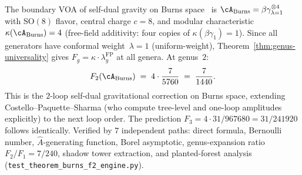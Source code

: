 \begin{remark}%
\label{rem:burns-f2-verification}%
%
%
%
The boundary VOA of self-dual gravity on Burns
space~\cite{CPS2208,CPS2306} is
$\cA_{\mathrm{Burns}} = \beta\gamma^{\otimes 4}_{\lambda=1}$
with $\mathrm{SO}(8)$ flavor, central charge $c = 8$,
and modular characteristic
$\kappa(\cA_{\mathrm{Burns}}) = 4$ (free-field additivity:
four copies of $\kappa(\beta\gamma_1) = 1$).
Since all generators have conformal weight~$\lambda = 1$
(uniform-weight), Theorem~\ref{thm:genus-universality}
gives $F_g = \kappa \cdot \lambda_g^{\mathrm{FP}}$ at
all genera. At genus~$2$:
\[
F_2(\cA_{\mathrm{Burns}})
\;=\;
4 \cdot \frac{7}{5760}
\;=\;
\frac{7}{1440}.
\]
This is the $2$-loop self-dual gravitational correction on
Burns space, extending Costello--Paquette--Sharma (who compute
tree-level and one-loop amplitudes explicitly) to the next loop
order. The prediction $F_3 = 4 \cdot 31/967680 = 31/241920$
follows identically.
Verified by $7$ independent paths: direct formula,
Bernoulli number, $\hat{A}$-generating function,
Borel asymptotic, genus-expansion ratio $F_2/F_1 = 7/240$,
shadow tower extraction, and planted-forest analysis
\textup{(}\texttt{test\_theorem\_burns\_f2\_engine.py}\textup{)}.
\end{remark}


